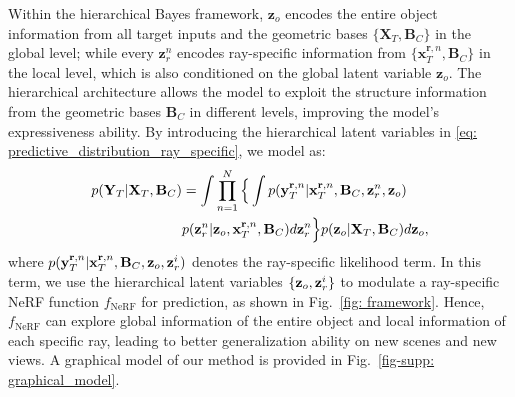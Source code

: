 Within the hierarchical Bayes framework, $\mathbf{z}_o$ encodes the entire object information from all target inputs and the geometric bases $\{\mathbf{X}_T, \mathbf{B}_C\}$ in the global level; while every $\mathbf{z}_r^{n}$ encodes ray-specific information from $\{ \mathbf{x}_T^{\mathbf{r}, n}, \mathbf{B}_C\}$ in the local level, which is also conditioned on the global latent variable $\mathbf{z}_o$. 
The hierarchical architecture allows the model to exploit the structure information from the geometric bases $\mathbf{B}_C$ in different levels, improving the model's expressiveness ability.
By introducing the hierarchical latent variables in \cref{eq: predictive_distribution_ray_specific}, we model \method{} as:
{\small
\begin{equation}
\begin{aligned}
        p({\bf{Y}}_{T}| {\bf{X}}_{T}, {\bf{B}}_{C}) &= \int \prod_{n=1}^{N} \Big\{ \int p({\bf{y}}_{T}^{\mathbf{r}, n}| {\bf{x}}_{T}^{\mathbf{r}, n}, {\bf{B}}_{C}, {\bf{z}}_r^n,{\bf{z}}_o ) \\
        &p({\bf{z}}_{r}^n| {\bf{z}}_o,  {\bf{x}}_{T}^{\mathbf{r}, n}, {\bf{B}}_C) d {\bf{z}}_r^n \Big\} p({\bf{z}}_o |{\bf{X}}_T, {\bf{B}}_C) d {\bf{z}}_o,
\end{aligned}
\label{eq:ganp-model}
\end{equation}
}where $p({\bf{y}}_{T}^{\mathbf{r}, n}| {\bf{x}}_{T}^{\mathbf{r}, n}, {\bf{B}}_{C}, {\bf{z}}_o, {\bf{z}}_r^i)$ denotes the ray-specific likelihood term. In this term, we use the hierarchical latent variables $\{{\bf{z}}_o, {\bf{z}}_r^i\}$ to modulate a ray-specific NeRF function $f_{\text{NeRF}}$ for prediction, as shown in Fig.~\ref{fig: framework}.
Hence, $f_{\text{NeRF}}$ can explore global information of the entire object and local information of each specific ray, leading to better generalization ability on new scenes and new views.
A graphical model of our method is provided in Fig.~\ref{fig-supp: graphical_model}. 


